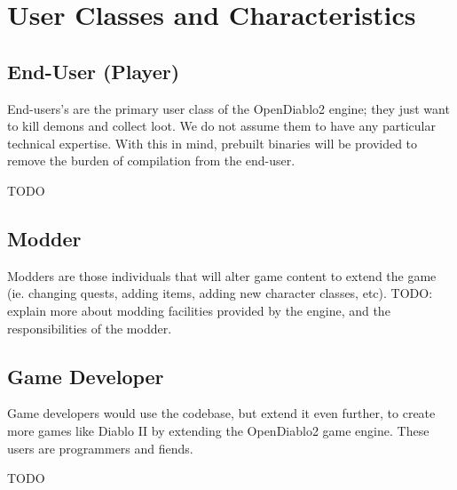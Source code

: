 \section{User Classes and Characteristics} \label{sec:userclasses}


\subsection{End-User (Player)}
End-users's are the primary user class of the OpenDiablo2 engine; they just want
to kill demons and collect loot. We do not assume them to have any particular
technical expertise. With this in mind,  prebuilt binaries will be provided to 
remove the burden of compilation from the end-user.

TODO

\subsection{Modder}
Modders are those individuals that will alter game content to extend the game
(ie. changing quests, adding items, adding new character classes, etc).
TODO: explain more about modding facilities provided by the engine, and the
responsibilities of the modder.

\subsection{Game Developer}
Game developers would use the codebase, but extend it even further, to create
more games like Diablo II by extending the OpenDiablo2 game engine. These users
are programmers and fiends.

TODO

